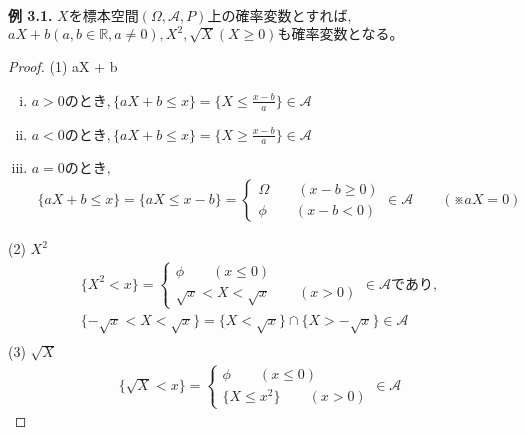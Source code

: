 \documentclass[dvipdfmx,10pt, a4j]{jarticle}
\theoremstyle{definition}
\begin{document}
    \newpage
    \noindent
    \textbf{例 3.1.} $Xを標本空間 (\Omega, \mathcal{A}, P)上の確率変数とすれば,$\\
    $aX + b(a, b \in \mathbb{R}, a \neq 0), X^{2}, \sqrt{X}(X \geq 0)も確率変数となる。$
    \begin{proof}
        (1) aX + b\\
        \begin{enumerate}[i)]
            \item $a > 0 のとき, \{aX + b \leq x\} = \{X \leq \frac{x-b}{a}\} \in \mathcal{A}$
            \item $a < 0 のとき, \{aX + b \leq x\} = \{X \geq \frac{x-b}{a}\} \in \mathcal{A}$
            \item $a = 0 のとき, $\\
            \begin{align*}
                \{aX + b \leq x\} = \{aX \leq x-b\} =
                \begin{cases}
                    \Omega \qquad (x-b \geq 0)\\
                    \phi \qquad (x-b < 0)
                \end{cases}
                \in \mathcal{A} \qquad (※aX = 0)
            \end{align*}
        \end{enumerate}
        (2) $X^{2}$\\
        \begin{align*}
            \{X^{2} < x\} =
            \begin{cases}
                \phi \qquad (x \leq 0)\\
                \sqrt{x} < X < \sqrt{x} \qquad (x > 0)
            \end{cases}
            \in \mathcal{A} であり,\\
            \{- \sqrt{x} < X < \sqrt{x}\} = \{X < \sqrt{x}\} \cap \{X > - \sqrt{x}\} \in \mathcal{A}\\
        \end{align*}
        (3) $\sqrt{X}$\\
        \begin{align*}
            \{\sqrt{X} < x\} = 
            \begin{cases}
                \phi \qquad (x \leq 0)\\
                \{X \leq x^{2}\} \qquad (x > 0)
            \end{cases}
            \in \mathcal{A}
        \end{align*}
    \end{proof}
    
\end{document}
